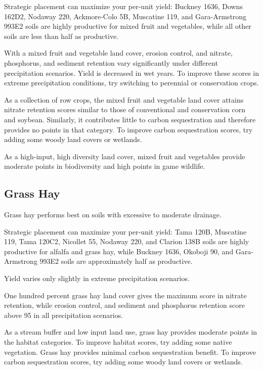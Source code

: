 \documentclass[11pt]{article}
\begin{document}
Strategic placement can maximize your per-unit yield: Buckney 1636, Downs 162D2, Nodaway 220, Ackmore-Colo 5B, Muscatine 119, and Gara-Armstrong 993E2 soils are highly productive for mixed fruit and vegetables, while all other soils are less than half as productive.

With a mixed fruit and vegetable land cover, erosion control, and nitrate, phosphorus, and sediment retention vary significantly under different precipitation scenarios. Yield is decreased in wet years. To improve these scores in extreme precipitation conditions, try switching to perennial or conservation crops.

As a collection of row crops, the mixed fruit and vegetable land cover attains nitrate retention scores similar to those of conventional and conservation corn and soybean. Similarly, it contributes little to carbon sequestration and therefore provides no points in that category. To improve carbon sequestration scores, try adding some woody land covers or wetlands.

As a high-input, high diversity land cover, mixed fruit and vegetables provide moderate points in biodiversity and high points in game wildlife.

\subsection{Grass Hay}

Grass hay performs best on soils with excessive to moderate drainage.

Strategic placement can maximize your per-unit yield: Tama 120B, Muscatine 119, Tama 120C2, Nicollet 55, Nodaway 220, and Clarion 138B soils are highly productive for alfalfa and grass hay, while Buckney 1636, Okoboji 90, and Gara-Armstrong 993E2 soils are approximately half as productive.

Yield varies only slightly in extreme precipitation scenarios.

One hundred percent grass hay land cover gives the maximum score in nitrate retention, while erosion control, and sediment and phosphorus retention score above 95 in all precipitation scenarios.

As a stream buffer and low input land use, grass hay provides moderate points in the habitat categories. To improve habitat scores, try adding some native vegetation. Grass hay provides minimal carbon sequestration benefit.  To improve carbon sequestration scores, try adding some woody land covers or wetlands.
\end{document}
